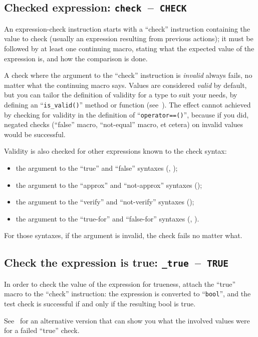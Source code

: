 \documentclass[twoside, a4paper, article]{memoir}
\newcommand*\testudocolor{\color{red!80!blue}}
\newcommand*\testudo[1]{\texttt{\testudocolor{}#1}}
\newcommand*\testudopair[2]{\testudo{#1}~--~\testudo{#2}}
\newcommand\subsectiontestudopair[3]{%
  \subsection[#1]{#1: \testudopair{#2}{#3}}}
\providecommand\typesetexample[1]{%
}
\begin{document}
\subsectiontestudopair{Checked expression}{check}{CHECK}
\label{sec:checked-expression}

An expression-check instruction starts with a ``check'' instruction containing
the value to check (usually an expression resulting from previous actions); it
must be followed by at least one continuing macro, stating what the expected
value of the expression is, and how the comparison is done.

A check where the argument to the ``check'' instruction is \emph{invalid}
always fails, no matter what the continuing macro says.  Values are considered
\emph{valid} by default, but you can tailor the definition of validity for a
type to suit your needs, by defining an ``\texttt{is\_valid()}'' method or
function (see~).  The effect cannot achieved by checking for
validity in the definition of ``\texttt{operator==()}'', because if you did,
negated checks (``false'' macro, ``not-equal'' macro, et cetera) on invalid
values would be successful.

Validity is also checked for other expressions known to the check syntax:
\begin{itemize}
\item the argument to the ``true'' and ``false'' syntaxes
  (, );
\item the argument to the ``approx'' and ``not-approx'' syntaxes
  ();
\item the argument to the ``verify'' and ``not-verify'' syntaxes
  ();
\item the argument to the ``true-for'' and ``false-for'' syntaxes
  (,
  ).
\end{itemize}
For those syntaxes, if the argument is invalid, the check fails no matter what.

\subsectiontestudopair{Check the expression is true}{\_true}{TRUE}
\label{sec:check-expression-true}

In order to check the value of the expression for trueness, attach the ``true''
macro to the ``check'' instruction: the expression is converted to
``\texttt{bool}'', and the test check is successful if and only if the
resulting bool is true.

\typesetexample{check-true}

See~ for an alternative version that can
show you what the involved values were for a failed ``true'' check.
\end{document}
